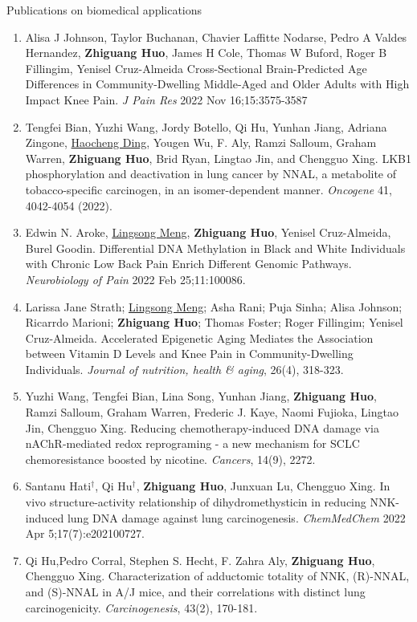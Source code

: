 \documentclass{resume} %
\begin{document}
\begin{rSection}{Publications on biomedical applications}
\begin{enumerate}[noitemsep,topsep=0pt, resume]
\item  
Alisa J Johnson, Taylor Buchanan, Chavier Laffitte Nodarse, Pedro A Valdes Hernandez, {\bf Zhiguang Huo}, James H Cole, Thomas W Buford, Roger B Fillingim, Yenisel Cruz-Almeida
Cross-Sectional Brain-Predicted Age Differences in Community-Dwelling Middle-Aged and Older Adults with High Impact Knee Pain. 
\emph{J Pain Res} 2022 Nov 16;15:3575-3587


\item
Tengfei Bian, Yuzhi Wang, Jordy Botello, Qi Hu, Yunhan Jiang, Adriana Zingone, \underline{Haocheng Ding}, Yougen Wu, F. Aly, Ramzi Salloum, Graham Warren, {\bf Zhiguang Huo}, Brid Ryan, Lingtao Jin, and Chengguo Xing. 
LKB1 phosphorylation and deactivation in lung cancer by NNAL, a metabolite of tobacco-specific carcinogen, in an isomer-dependent manner.
\emph{Oncogene} 41, 4042-4054 (2022).

\item
Edwin N. Aroke, \underline{Lingsong Meng}, {\bf Zhiguang Huo}, Yenisel Cruz-Almeida, Burel Goodin.
Differential DNA Methylation in Black and White Individuals with Chronic Low Back Pain Enrich Different Genomic Pathways. 
\emph{Neurobiology of Pain} 2022 Feb 25;11:100086. 

\item
Larissa Jane Strath; \underline{Lingsong Meng}; Asha Rani; Puja Sinha; Alisa Johnson; Ricarrdo Marioni; {\bf Zhiguang Huo}; Thomas Foster; Roger Fillingim; Yenisel Cruz-Almeida. 
Accelerated Epigenetic Aging Mediates the Association between Vitamin D Levels and Knee Pain in Community-Dwelling Individuals. 
\emph{Journal of nutrition, health \& aging}, 26(4), 318-323.


\item
Yuzhi Wang, Tengfei Bian, Lina Song, Yunhan Jiang, {\bf Zhiguang Huo}, Ramzi Salloum, Graham Warren, Frederic J. Kaye, Naomi Fujioka, Lingtao Jin, Chengguo Xing.
Reducing chemotherapy-induced DNA damage via nAChR-mediated redox reprograming - a new mechanism for SCLC chemoresistance boosted by nicotine.
\emph{Cancers}, 14(9), 2272.

\item
Santanu Hati$^\dagger$, Qi Hu$^\dagger$, {\bf Zhiguang Huo}, Junxuan Lu, Chengguo Xing. 
In vivo structure-activity relationship of dihydromethysticin in reducing NNK-induced lung DNA damage against lung carcinogenesis.
\emph{ChemMedChem} 2022 Apr 5;17(7):e202100727.

\item
Qi Hu,Pedro Corral, Stephen S. Hecht, F. Zahra Aly,  {\bf Zhiguang Huo}, Chengguo Xing.
Characterization of adductomic totality of NNK, (R)-NNAL, and (S)-NNAL in A/J mice, and their correlations with distinct lung carcinogenicity. 
\emph{Carcinogenesis}, 43(2), 170-181.



\end{enumerate}
\end{rSection}
\end{document}
